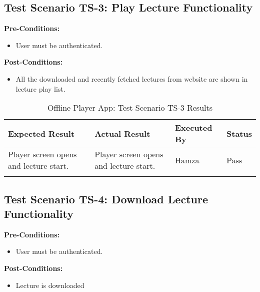 \subsection{Test Scenario TS-3: Play Lecture Functionality}

\textbf{Pre-Conditions: }
\begin{itemize}

\item User must be authenticated.

\end{itemize}


\textbf{Post-Conditions: }
\begin{itemize}

\item All the downloaded and recently fetched lectures from website are shown in lecture play list.

\end{itemize}



\bigskip

\begin{longtable}{|p{4cm}|p{4cm}|p{2cm}|p{2cm}|}
\hline
\textbf{Expected Result} & \textbf{Actual Result} & \textbf{Executed By} & \textbf{Status}\\
\hline
Player screen opens and lecture start. &
Player screen opens and lecture start. &
Hamza &
Pass \\
\hline

\caption{Offline Player App: Test Scenario TS-3 Results}
\end{longtable}

\subsection{Test Scenario TS-4: Download Lecture Functionality}

\textbf{Pre-Conditions: }
\begin{itemize}

\item User must be authenticated.

\end{itemize}


\textbf{Post-Conditions: }
\begin{itemize}

\item Lecture is downloaded

\end{itemize}



